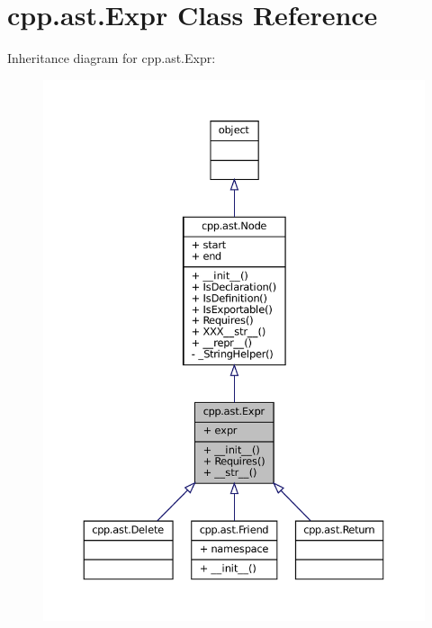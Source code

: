 \hypertarget{classcpp_1_1ast_1_1Expr}{}\section{cpp.\+ast.\+Expr Class Reference}
\label{classcpp_1_1ast_1_1Expr}


Inheritance diagram for cpp.\+ast.\+Expr\+:
\nopagebreak
\begin{figure}[H]
\begin{center}
\leavevmode
\includegraphics[width=350pt]{classcpp_1_1ast_1_1Expr__inherit__graph}
\end{center}
\end{figure}


